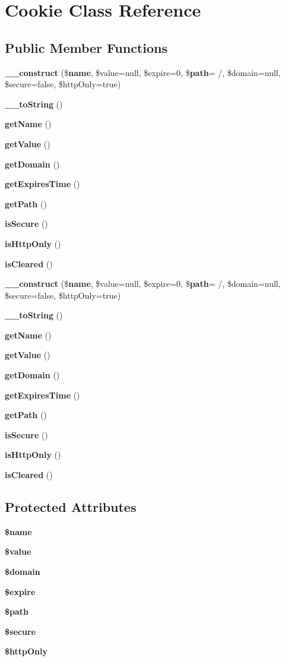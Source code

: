 \section{Cookie Class Reference}
\label{class_symfony_1_1_component_1_1_http_foundation_1_1_cookie}
\subsection*{Public Member Functions}
\begin{DoxyCompactItemize}
\item 
{\bf \+\_\+\+\_\+construct} (\${\bf name}, \$value=null, \$expire=0, \${\bf path}= \textquotesingle{}/\textquotesingle{}, \$domain=null, \$secure=false, \$http\+Only=true)
\item 
{\bf \+\_\+\+\_\+to\+String} ()
\item 
{\bf get\+Name} ()
\item 
{\bf get\+Value} ()
\item 
{\bf get\+Domain} ()
\item 
{\bf get\+Expires\+Time} ()
\item 
{\bf get\+Path} ()
\item 
{\bf is\+Secure} ()
\item 
{\bf is\+Http\+Only} ()
\item 
{\bf is\+Cleared} ()
\item 
{\bf \+\_\+\+\_\+construct} (\${\bf name}, \$value=null, \$expire=0, \${\bf path}= \textquotesingle{}/\textquotesingle{}, \$domain=null, \$secure=false, \$http\+Only=true)
\item 
{\bf \+\_\+\+\_\+to\+String} ()
\item 
{\bf get\+Name} ()
\item 
{\bf get\+Value} ()
\item 
{\bf get\+Domain} ()
\item 
{\bf get\+Expires\+Time} ()
\item 
{\bf get\+Path} ()
\item 
{\bf is\+Secure} ()
\item 
{\bf is\+Http\+Only} ()
\item 
{\bf is\+Cleared} ()
\end{DoxyCompactItemize}
\subsection*{Protected Attributes}
\begin{DoxyCompactItemize}
\item 
{\bf \$name}
\item 
{\bf \$value}
\item 
{\bf \$domain}
\item 
{\bf \$expire}
\item 
{\bf \$path}
\item 
{\bf \$secure}
\item 
{\bf \$http\+Only}
\end{DoxyCompactItemize}


